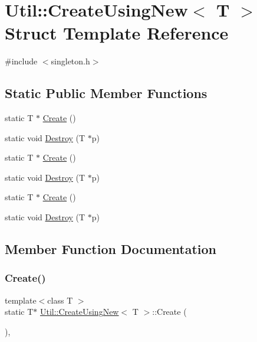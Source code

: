 \hypertarget{structUtil_1_1CreateUsingNew}{}\section{Util\+:\+:Create\+Using\+New$<$ T $>$ Struct Template Reference}
\label{structUtil_1_1CreateUsingNew}


{\ttfamily \#include $<$singleton.\+h$>$}

\subsection*{Static Public Member Functions}
\begin{DoxyCompactItemize}
\item 
static T $\ast$ \mbox{\hyperlink{structUtil_1_1CreateUsingNew_ad9b089ba34328e89a9e6b6211ee714c5}{Create}} ()
\item 
static void \mbox{\hyperlink{structUtil_1_1CreateUsingNew_a5e4b35ac95cb42c29d2542422ac6d17d}{Destroy}} (T $\ast$p)
\item 
static T $\ast$ \mbox{\hyperlink{structUtil_1_1CreateUsingNew_ad9b089ba34328e89a9e6b6211ee714c5}{Create}} ()
\item 
static void \mbox{\hyperlink{structUtil_1_1CreateUsingNew_a5e4b35ac95cb42c29d2542422ac6d17d}{Destroy}} (T $\ast$p)
\item 
static T $\ast$ \mbox{\hyperlink{structUtil_1_1CreateUsingNew_ad9b089ba34328e89a9e6b6211ee714c5}{Create}} ()
\item 
static void \mbox{\hyperlink{structUtil_1_1CreateUsingNew_a5e4b35ac95cb42c29d2542422ac6d17d}{Destroy}} (T $\ast$p)
\end{DoxyCompactItemize}


\subsection{Member Function Documentation}
\mbox{\label{structUtil_1_1CreateUsingNew_ad9b089ba34328e89a9e6b6211ee714c5}} 
\subsubsection{\texorpdfstring{Create()}{Create()}\hspace{0.1cm}{\footnotesize\ttfamily [1/3]}}
{\footnotesize\ttfamily template$<$class T $>$ \\
static T$\ast$ \mbox{\hyperlink{structUtil_1_1CreateUsingNew}{Util\+::\+Create\+Using\+New}}$<$ T $>$\+::Create (\begin{DoxyParamCaption}{ }\end{DoxyParamCaption})\hspace{0.3cm}{\ttfamily [inline]}, {\ttfamily [static]}}

